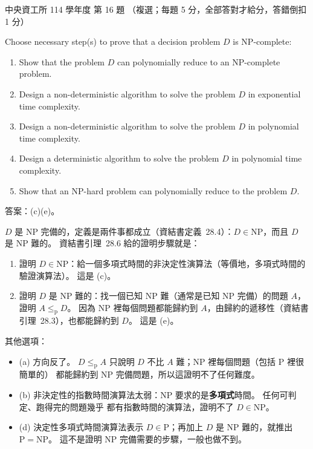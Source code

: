 \begin{pastexam}[label={px:ncu-114-dsa-16}]{中央資工所 114 學年度 第 16 題}
（複選；每題 5 分，全部答對才給分，答錯倒扣 1 分）

Choose necessary step(s) to prove that a decision problem $D$ is NP-complete:
\begin{enumerate}[label=(\alph*)]
\item Show that the problem $D$ can polynomially reduce to an NP-complete problem.
\item Design a non-deterministic algorithm to solve the problem $D$ in exponential time complexity.
\item Design a non-deterministic algorithm to solve the problem $D$ in polynomial time complexity.
\item Design a deterministic algorithm to solve the problem $D$ in polynomial time complexity.
\item Show that an NP-hard problem can polynomially reduce to the problem $D$.
\end{enumerate}
\end{pastexam}

\begin{pastsoln}
答案：(c)(e)。

$D$ 是 NP 完備的，定義是兩件事都成立（資結書定義~28.4）：$D \in \mathrm{NP}$，而且 $D$ 是 NP 難的。
資結書引理~28.6 給的證明步驟就是：
\begin{enumerate}
\item 證明 $D \in \mathrm{NP}$：給一個多項式時間的非決定性演算法（等價地，多項式時間的驗證演算法）。
這是 (c)。
\item 證明 $D$ 是 NP 難的：找一個已知 NP 難（通常是已知 NP 完備）的問題 $A$，證明 $A \le_{\mathrm{p}} D$。
因為 NP 裡每個問題都能歸約到 $A$，由歸約的遞移性（資結書引理~28.3），也都能歸約到 $D$。 這是 (e)。
\end{enumerate}

其他選項：
\begin{itemize}
\item (a) 方向反了。 $D \le_{\mathrm{p}} A$ 只說明 $D$ 不比 $A$ 難；NP 裡每個問題（包括 P 裡很簡單的）
都能歸約到 NP 完備問題，所以這證明不了任何難度。
\item (b) 非決定性的指數時間演算法太弱：NP 要求的是\textbf{多項式}時間。 任何可判定、跑得完的問題幾乎
都有指數時間的演算法，證明不了 $D \in \mathrm{NP}$。
\item (d) 決定性多項式時間演算法表示 $D \in \mathrm{P}$；再加上 $D$ 是 NP 難的，就推出
$\mathrm{P} = \mathrm{NP}$。 這不是證明 NP 完備需要的步驟，一般也做不到。
\end{itemize}
\end{pastsoln}
